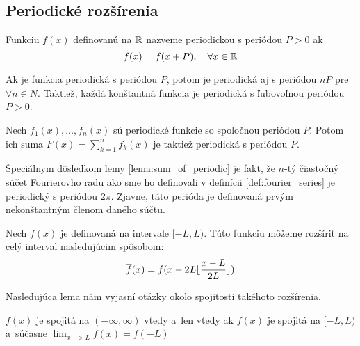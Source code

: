 \subsection{Periodické rozšírenia}

\begin{definicia}
  Funkciu $f(x)$ definovanú na ${\mathbb R}$ nazveme periodickou s periódou
  $P>0$ ak
  \begin{equation*}
    f(x) = f(x+P), \quad \forall x \in {\mathbb R}
  \end{equation*}
\end{definicia}
\begin{poznamka}
    Ak je funkcia periodická s periódou $P$, potom je periodická
    aj s periódou $nP$ pre $\forall n \in N$. 
    Taktiež, každá konštantná funkcia je periodická s ľubovoľnou
    periódou $P>0$.
\end{poznamka}

\begin{lema}
    Nech $f_1(x), \dots, f_n(x)$ sú periodické funkcie so spoločnou
    periódou $P$. Potom ich suma $F(x) = \sum_{k=1}^n f_k(x)$
    je taktiež periodická s periódou $P$.
    \label{lema:sum_of_periodic}
\end{lema}
Špeciálnym dôsledkom lemy \ref{lema:sum_of_periodic} je fakt, že
 $n$-tý čiastočný súčet Fourierovho radu ako sme ho definovali
 v definícii \ref{def:fourier_series} je periodický s periódou
 $2\pi$. Zjavne, táto perióda je definovaná prvým nekonštantným členom
 daného súčtu.

\begin{definicia}
    Nech $f(x)$ je definovaná na intervale $[-L,L)$. Túto funkciu
    môžeme rozšíriť na celý interval nasledujúcim spôsobom:
    \begin{equation*}
      \overline{f}(x) = f(x - 2L \lfloor \frac{x-L}{2L} \rfloor)
    \end{equation*}
\end{definicia}

Nasledujúca lema nám vyjasní otázky okolo spojitosti takéhoto
rozšírenia.
\begin{lema}
    $\overline{f}(x)$ je spojitá na $(-\infty,\infty)$ vtedy a~len
    vtedy ak $f(x)$ je spojitá na $[-L,L)$ a~súčasne $\lim_{x->L} f(x) = f(-L)$
\end{lema}

